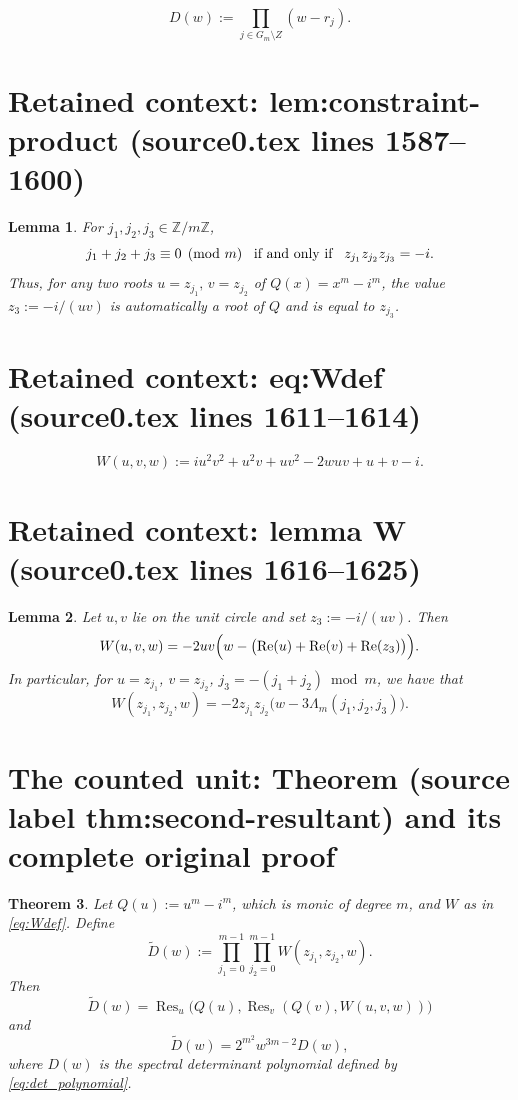 \documentclass[10pt,a4paper]{amsart}
\DeclareMathOperator{\Res}{Res}
\theoremstyle{plain}
\newtheorem{theorem}{Theorem}[section]
\newtheorem{lemma}[theorem]{Lemma}
\theoremstyle{remark}
\begin{document}
\begin{equation}\label{eq:det_polynomial}
D(w) := \prod_{j\in G_m \setminus Z}(w-r_j).
\end{equation}


\section*{Retained context: lem:constraint-product (source0.tex lines 1587--1600)}

\begin{lemma}
\label{lem:constraint-product}
For $j_1,j_2,j_3\in\mathbb Z/m\mathbb Z$,
\[
j_1+j_2+j_3\equiv0\pmod m
\,\,\,\,\,
\text{\rm if and only if}
\,\,\,\,\,
 z_{j_1}z_{j_2}z_{j_3}=-i.
\]
Thus, for any two roots $u=z_{j_1},\,v=z_{j_2}$ of $Q(x)=x^m-i^m$,
the value $z_3:=-i/(uv)$ is automatically a root of $Q$ and is equal to
$z_{j_3}$.
\end{lemma}


\section*{Retained context: eq:Wdef (source0.tex lines 1611--1614)}

\begin{equation}
\label{eq:Wdef}
W(u,v,w) := iu^2v^2+u^2v+uv^2-2wuv+u+v-i.
\end{equation}


\section*{Retained context: lemma W (source0.tex lines 1616--1625)}

\begin{lemma}\label{lemma W}
Let $u, v$ lie on the unit circle and set $z_3 := -i/(uv)$. Then
\[
W(u,v,w) = -2uv\Bigl(w - \bigl(\operatorname{Re}(u)+\operatorname{Re}(v)+\operatorname{Re}(z_3)\bigr)\Bigr).
\]
In particular, for $u = z_{j_1}$, $v = z_{j_2}$, $j_3 = -(j_1+j_2) \bmod m$, we have that
\[
W(z_{j_1}, z_{j_2}, w) = -2z_{j_1}z_{j_2}\bigl(w - 3\Lambda_{m}(j_1,j_2,j_3)\bigr).
\]
\end{lemma}


\section{The counted unit: Theorem (source label thm:second-resultant) and its complete original proof}

\begin{theorem}
\label{thm:second-resultant}
Let $Q(u):=u^m-i^m$, which is monic of degree $m$, and $W$ as in \eqref{eq:Wdef}.
Define
\begin{equation}\label{eq:resultant_product}
\widetilde D(w) := \prod_{j_1=0}^{m-1}\prod_{j_2=0}^{m-1}W(z_{j_1},z_{j_2},w).
\end{equation}
Then
$$
\widetilde D(w) =
\Res_u\big(Q(u),\Res_v(Q(v),W(u,v,w))\big)
$$
and
\[
\widetilde D(w) = 2^{m^2}w^{3m-2}D(w),
\]
where $D(w)$ is the spectral determinant polynomial defined by \eqref{eq:det_polynomial}.
\end{theorem}
\end{document}
